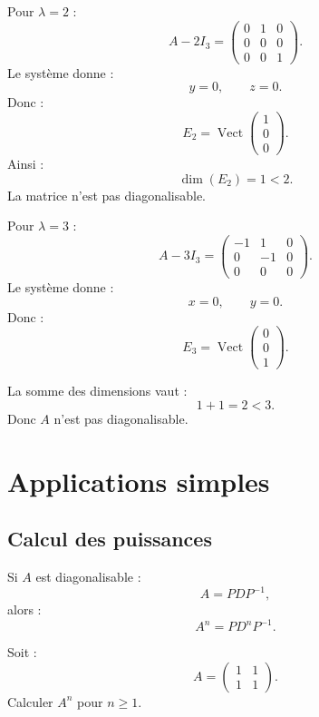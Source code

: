 \documentclass[11pt,a4paper]{article}
\newcommand{\Vect}{\operatorname{Vect}}
\begin{document}
Pour \(\lambda=2\) :
\[
A-2I_3=
\begin{pmatrix}
0&1&0\\
0&0&0\\
0&0&1
\end{pmatrix}.
\]
Le système donne :
\[
y=0,
\qquad
z=0.
\]
Donc :
\[
E_2=\Vect
\begin{pmatrix}
1\\0\\0
\end{pmatrix}.
\]
Ainsi :
\[
\dim(E_2)=1<2.
\]
La matrice n'est pas diagonalisable.

Pour \(\lambda=3\) :
\[
A-3I_3=
\begin{pmatrix}
-1&1&0\\
0&-1&0\\
0&0&0
\end{pmatrix}.
\]
Le système donne :
\[
x=0,\qquad y=0.
\]
Donc :
\[
E_3=\Vect
\begin{pmatrix}
0\\0\\1
\end{pmatrix}.
\]

La somme des dimensions vaut :
\[
1+1=2<3.
\]
Donc \(A\) n'est pas diagonalisable.

\section{Applications simples}

\subsection{Calcul des puissances}

Si \(A\) est diagonalisable :
\[
A=PDP^{-1},
\]
alors :
\[
A^n=PD^nP^{-1}.
\]

\begin{exercicebox}
Soit :
\[
A=
\begin{pmatrix}
1&1\\
1&1
\end{pmatrix}.
\]
Calculer \(A^n\) pour \(n\geq1\).
\end{exercicebox}
\end{document}
